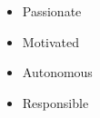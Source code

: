 %
%
%

\twocolumnsection
{
\begin{skills}
\end{skills}}
{
\vspace{1em}
\begin{itemize}
	\item Passionate
	\item Motivated
    \item Autonomous
    \item Responsible
\end{itemize}
}
